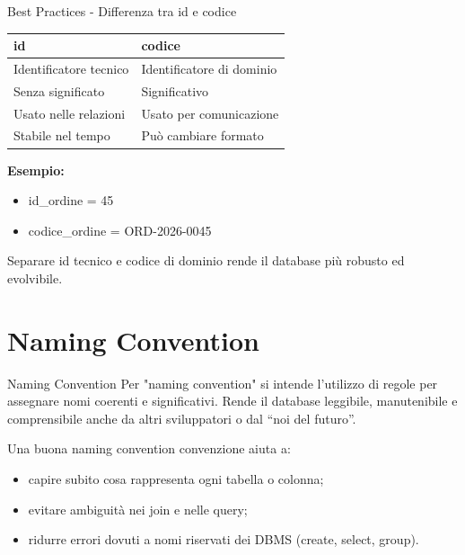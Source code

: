 \documentclass{beamer}
\begin{document}
\begin{frame}{Best Practices - Differenza tra id e codice}
\small

\begin{tabular}{|l|l|}
\hline
\textbf{id} & \textbf{codice} \\
\hline
Identificatore tecnico & Identificatore di dominio \\
Senza significato & Significativo \\
Usato nelle relazioni & Usato per comunicazione \\
Stabile nel tempo & Può cambiare formato \\
\hline
\end{tabular}

\medskip
\textbf{Esempio:}
\begin{itemize}
    \item id\_ordine = 45
    \item codice\_ordine = ORD-2026-0045
\end{itemize}

\medskip
\alert{Separare id tecnico e codice di dominio rende il database più robusto ed evolvibile.}
\end{frame}


\section{Naming Convention}

\begin{frame}{Naming Convention}
Per "naming convention" si intende l'utilizzo di regole per assegnare nomi coerenti e significativi. Rende il database leggibile, manutenibile e comprensibile anche da altri sviluppatori o dal “noi del futuro”.

\medskip
Una buona naming convention convenzione aiuta a:
\begin{itemize}
    \item capire subito cosa rappresenta ogni tabella o colonna;
    \item evitare ambiguità nei join e nelle query;
    \item ridurre errori dovuti a nomi riservati dei DBMS (create, select, group).
\end{itemize}

\end{frame} 
\end{document}
